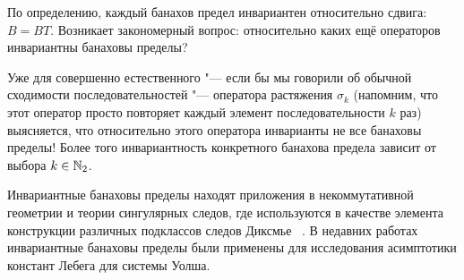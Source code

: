 По определению, каждый банахов предел инвариантен относительно сдвига: $B=BT$.
Возникает закономерный вопрос: относительно каких ещё операторов инвариантны банаховы пределы?

Уже для совершенно естественного "--- если бы мы говорили об обычной сходимости последовательностей "---
оператора растяжения $\sigma_k$
(напомним, что этот оператор просто повторяет каждый элемент последовательности $k$ раз)
выясняется, что относительно этого оператора инварианты не все банаховы пределы!
Более того инвариантность конкретного банахова предела зависит от выбора $k\in\mathbb{N}_2$.




Инвариантные банаховы пределы находят приложения в некоммутативной геометрии
и теории сингулярных следов, где используются в качестве элемента конструкции
различных подклассов следов Диксмье
~\cite{carey2003spectral,lord2012singular,sukochev2015characterization,sukochev2016dixmier}.
В недавних работах~\cite{astashkin2015constants_rus_DAN,astashkin2016constants_rus_SMJ} инвариантные банаховы пределы были применены для исследования
асимптотики констант Лебега для системы Уолша.

